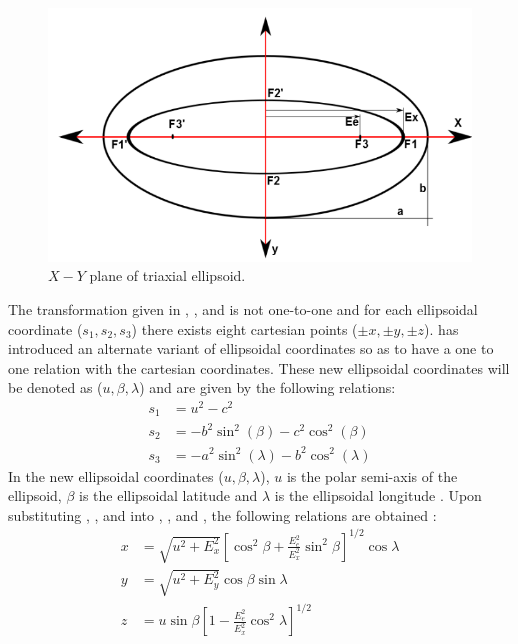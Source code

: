 %
\begin{figure}[h]
\centering
\captionsetup{justification=centering}
\includegraphics[scale=0.5]{ellipse_3_final.png}
\caption{$X-Y$ plane of triaxial ellipsoid.}
\label{xyplane}
\end{figure}
%
The transformation given in , , and  is not one-to-one and for each ellipsoidal coordinate ($s_1, s_2, s_3$) there exists eight cartesian points ($\pm x,\pm y,\pm z$). \cite{elliptic_integral} has introduced an alternate variant of ellipsoidal coordinates so as to have a one to one relation with the cartesian coordinates. These new ellipsoidal coordinates will be denoted as ($u, \beta, \lambda$) and are given by the following relations:
\begin{align}
\label{uelip}
s_1 &= u^2 - c^2\\
\label{betaelip}
s_2 &= -b^2\sin^2(\beta) - c^2\cos^2(\beta)\\
\label{lambdaelip}
s_3 &= -a^2\sin^2(\lambda)-b^2\cos^2(\lambda)
\end{align}
%
In the new ellipsoidal coordinates ($u, \beta, \lambda$), $u$ is the polar semi-axis of the ellipsoid, $\beta$ is the ellipsoidal latitude and $\lambda$ is the ellipsoidal longitude \cite{elliptic_integral}. Upon substituting , , and  into , , and , the following relations are obtained \cite{elliptic_integral}:
\begin{align}
\label{xelip}
x &= \sqrt{u^2 + E_x^2} \left[\cos^2\beta + \frac{E_e^2}{E_x^2}\sin^2\beta \right]^{1/2} \cos\lambda\\
\label{yelip}
y &= \sqrt{u^2 + E_y^2}\cos\beta \sin\lambda\\
\label{zelip}
z &= u\sin\beta \left[1 - \frac{E_e^2}{E_x^2}\cos^2\lambda \right]^{1/2}
\end{align}
